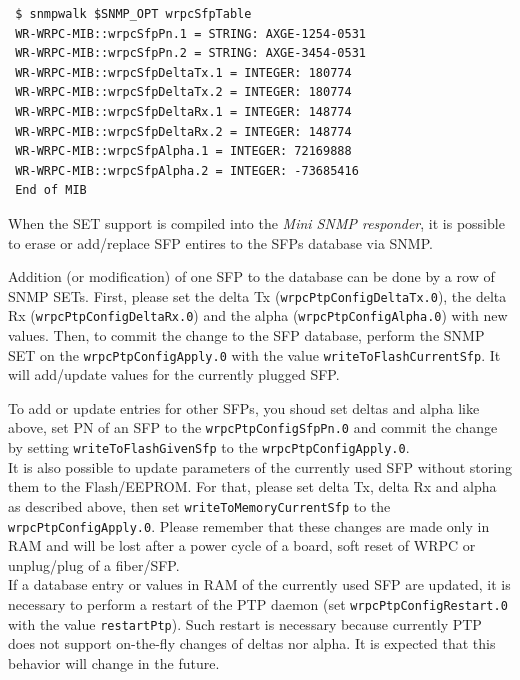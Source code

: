 \documentclass[a4paper, 12pt]{article}
\renewcommand{\_}{\underscore\allowbreak}
\begin{document}
\begin{lstlisting}
 $ snmpwalk $SNMP_OPT wrpcSfpTable
 WR-WRPC-MIB::wrpcSfpPn.1 = STRING: AXGE-1254-0531
 WR-WRPC-MIB::wrpcSfpPn.2 = STRING: AXGE-3454-0531
 WR-WRPC-MIB::wrpcSfpDeltaTx.1 = INTEGER: 180774
 WR-WRPC-MIB::wrpcSfpDeltaTx.2 = INTEGER: 180774
 WR-WRPC-MIB::wrpcSfpDeltaRx.1 = INTEGER: 148774
 WR-WRPC-MIB::wrpcSfpDeltaRx.2 = INTEGER: 148774
 WR-WRPC-MIB::wrpcSfpAlpha.1 = INTEGER: 72169888
 WR-WRPC-MIB::wrpcSfpAlpha.2 = INTEGER: -73685416
 End of MIB
\end{lstlisting}
When the SET support is compiled into the \textit{Mini SNMP responder}, it is
possible to erase or add/replace SFP entires to the SFPs database via SNMP.\\

\begin{sloppypar} %
Addition (or modification) of one SFP to the database can be done by a row of
SNMP SETs. First, please set the delta Tx (\texttt{wrpcPtpConfigDeltaTx.0}), the
delta Rx (\texttt{wrpcPtpConfigDeltaRx.0}) and the alpha (\texttt{wrpcPtpConfigAlpha.0})
with new values. Then, to commit the change to the SFP database, perform the SNMP SET on
the \texttt{wrpcPtpConfigApply.0} with the value \texttt{writeToFlashCurrentSfp}. It will
add/update values for the currently plugged SFP.
\end{sloppypar}

To add or update entries for other SFPs, you shoud set deltas and alpha like
above, set PN of an SFP to the \texttt{wrpcPtpConfigSfpPn.0} and commit
the change by setting \texttt{writeToFlashGivenSfp} to the
\texttt{wrpcPtpConfigApply.0}.\\

It is also possible to update parameters of the currently used SFP without
storing them to the Flash/EEPROM. For that, please set delta Tx, delta Rx and
alpha as described above, then set \texttt{writeToMemoryCurrentSfp} to the
\texttt{wrpcPtpConfigApply.0}. Please remember that these changes are made only
in RAM and will be lost after a power cycle of a board, soft reset of WRPC or
unplug/plug of a fiber/SFP.\\

If a database entry or values in RAM of the currently used SFP are updated, it is
necessary to perform a restart of the PTP daemon
(set \texttt{wrpcPtpConfigRestart.0} with the value \texttt{restartPtp}). Such
restart is necessary because currently PTP does not support on-the-fly changes
of deltas nor alpha. It is expected that this behavior will change in the
future.\\
\end{document}
